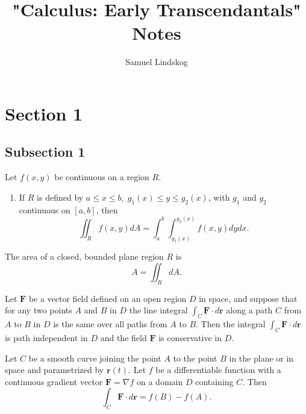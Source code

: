 \documentclass{article}
\title{"Calculus: Early Transcendantals" Notes}
\author{Samuel Lindskog}
\begin{document}
\maketitle
{}
\tableofcontents
{}
\clearpage
{}
\setcounter{page}{1}

\section{Section 1}
\subsection{Subsection 1}
\begin{theorem}
	Let \(f(x,y)\) be continuous on a region \(R\).
	\begin{enumerate}
		\item If \(R\) is defined by \(a\leq x\leq b,\;g_1(x)\leq y\leq g_2(x)\), with \(g_1\) and \(g_2\) continuous on \([a,b]\), then
			\begin{equation*}
				\iint_R f(x,y)dA=\int_a^b\int_{g_1(x)}^{g_2(x)}f(x,y)dydx.
			\end{equation*}
	\end{enumerate}
\end{theorem}
\begin{proposition}
	The area of a closed, bounded plane region \(R\) is
	\begin{equation*}
		A=\iint_R dA.
	\end{equation*}
\end{proposition}
\begin{definition}
	Let \(\textbf{F}\) be a vector field defined on an open region \(D\) in space, and suppose that for any two points \(A\) and \(B\) in \(D\) the line integral \(\int_C \textbf{F}\cdot d\textbf{r}\) along a path \(C\) from \(A\) to \(B\) in \(D\) is the same over all paths from \(A\) to \(B\). Then the integral \(\int_C\textbf{F}\cdot d\textbf{r}\) is path independent in \(D\) and the field \(\textbf{F}\) is conservative in \(D\).
\end{definition}
\begin{theorem}
	Let \(C\) be a smooth curve joining the point \(A\) to the point \(B\) in the plane or in space and parametrized by \(\textbf{r}(t)\). Let \(f\) be a differentiable function with a continuous gradient vector \(\textbf{F}=\nabla f\) on a domain \(D\) containing \(C\). Then
	\begin{equation*}
		\int_C\textbf{F}\cdot d\textbf{r}=f(B)-f(A).
	\end{equation*}
\end{theorem}
\end{document}
